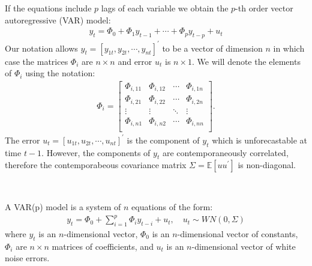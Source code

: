 If the equations include $p$ lags of each variable we obtain the $p$-th order vector autoregressive (VAR) model:
\begin{gather}\label{eq:varp}
    y_t = \Phi_0 + \Phi_1 y_{t-1} + \cdots + \Phi_p y_{t-p} + u_t
\end{gather}
Our notation allows $y_t = [y_{1t}, y_{2t}, \cdots, y_{nt}]^{\prime}$ to be a vector of dimension $n$ in which case the matrices $\Phi_i$ are $n \times n$ and error $u_t$ is $n \times 1$.
We will denote the elements of $\Phi_i$ using the notation:
\begin{gather*}
    \Phi_i = \begin{bmatrix}
        \Phi_{i,11} & \Phi_{i,12} & \cdots & \Phi_{i,1n} \\
        \Phi_{i,21} & \Phi_{i,22} & \cdots & \Phi_{i,2n} \\
        \vdots & \vdots & \ddots & \vdots \\
        \Phi_{i,n1} & \Phi_{i,n2} & \cdots & \Phi_{i,nn} \\
    \end{bmatrix}.
\end{gather*}
The error $u_t = [u_{1t}, u_{2t}, \cdots, u_{nt}]^{\prime}$ is the component of $y_t$ which is unforecastable at time $t-1$.
However, the components of $y_t$ are contemporaneously correlated, therefore the contemporabeous covariance matrix $\Sigma = \mathbb{E}[u u^{\prime}]$ is non-diagonal.
\begin{definition}[VAR$(p)$]\label{def:varp}
    \

    A VAR(p) model is a system of $n$ equations of the form:
    \begin{gather}\label{eq:varp-def}
        y_t = \Phi_0 + \sum_{i=1}^{p} \Phi_i y_{t-i} + u_t, \quad u_t \sim WN(0, \Sigma)
    \end{gather}
    where $y_t$ is an $n$-dimensional vector, $\Phi_0$ is an $n$-dimensional vector of constants, $\Phi_i$ are $n \times n$ matrices of coefficients, and $u_t$ is an $n$-dimensional vector of white noise errors.
\end{definition}

